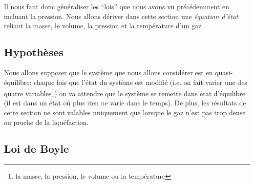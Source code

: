 \documentclass[a4paper,12pt]{book}
\begin{document}
Il nous faut donc généraliser les ``lois'' que nous avons vu précédemment en incluant la pression. Nous allons dériver dans cette section une \textit{équation d'état} reliant la masse, le volume, la pression et la température d'un gaz.  

\subsection{Hypothèses}

Nous allons supposer que le système que nous allons considérer
est en quasi-équilibre: chaque fois que l'état du système est 
modifié (i.e. on fait varier une des quatre variables\footnote{
la masse, la pression, le volume ou la température}) on va 
attendre que le système se remette dans état d'équilibre (il est 
dans un état où plus rien ne varie dans le temps). De plus, les 
résultats de cette section ne sont valables uniquement que
lorsque le gaz n'est pas trop dense ou proche de la liquéfaction.

\subsection{Loi de Boyle}
\end{document}
